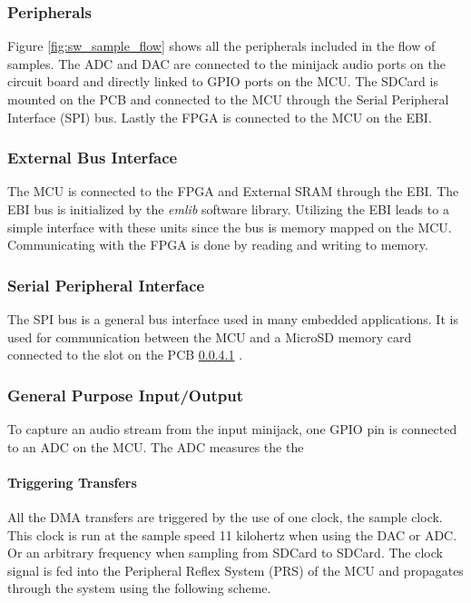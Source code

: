 \subsubsection{Peripherals}



Figure \ref{fig:sw_sample_flow} shows all the peripherals included in the flow of samples.
The ADC and DAC are connected to the minijack audio ports on the circuit board and directly
linked to GPIO ports on the MCU. The SDCard
is mounted on the PCB and connected to the MCU through the Serial Peripheral Interface (SPI)
bus. Lastly the FPGA is connected to the MCU on the EBI.

\subsubsection{External Bus Interface}
The MCU is connected to the FPGA and External SRAM through the EBI. The EBI bus
is initialized by the {\it emlib} software library. Utilizing
the EBI leads to a simple interface with these units since the bus is memory
mapped on the MCU. Communicating with the FPGA is done by reading and writing to memory.

\subsubsection{Serial Peripheral Interface}
The SPI bus is a general bus interface used in many embedded applications. It is used
for communication between the MCU and a MicroSD memory card connected to the slot
on the PCB \ref{} .

\subsubsection{General Purpose Input/Output}
To capture an audio stream from the input minijack, one GPIO pin is connected to an
ADC on the MCU. The ADC measures the the


\paragraph{Triggering Transfers}

All the DMA transfers are triggered by the use of one clock, the sample clock.
This clock is run at the sample speed 11 kilohertz when using the DAC or ADC. Or
an arbitrary frequency when sampling from SDCard to SDCard. The clock signal is fed into
the Peripheral Reflex System  (PRS) of the MCU and propagates
through the system using the following scheme.


